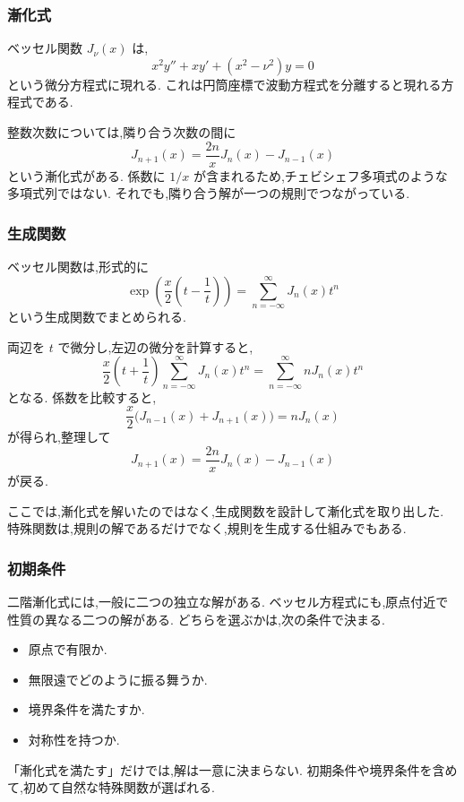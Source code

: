 \subsubsection{漸化式}

ベッセル関数 $J_\nu(x)$ は,
\[
  x^2y''+xy'+(x^2-\nu^2)y=0
\]
という微分方程式に現れる.
これは円筒座標で波動方程式を分離すると現れる方程式である.

整数次数については,隣り合う次数の間に
\[
  J_{n+1}(x)
  =\frac{2n}{x}J_n(x)-J_{n-1}(x)
\]
という漸化式がある.
係数に $1/x$ が含まれるため,チェビシェフ多項式のような多項式列ではない.
それでも,隣り合う解が一つの規則でつながっている.

\subsubsection{生成関数}

ベッセル関数は,形式的に
\[
  \exp\left(\frac{x}{2}\left(t-\frac1t\right)\right)
  =\sum_{n=-\infty}^{\infty}J_n(x)t^n
\]
という生成関数でまとめられる.

両辺を $t$ で微分し,左辺の微分を計算すると,
\[
  \frac{x}{2}\left(t+\frac1t\right)
  \sum_{n=-\infty}^{\infty}J_n(x)t^n
  =
  \sum_{n=-\infty}^{\infty}nJ_n(x)t^n
\]
となる.
係数を比較すると,
\[
  \frac{x}{2}\bigl(J_{n-1}(x)+J_{n+1}(x)\bigr)
  =nJ_n(x)
\]
が得られ,整理して
\[
  J_{n+1}(x)=\frac{2n}{x}J_n(x)-J_{n-1}(x)
\]
が戻る.

ここでは,漸化式を解いたのではなく,生成関数を設計して漸化式を取り出した.
特殊関数は,規則の解であるだけでなく,規則を生成する仕組みでもある.

\subsubsection{初期条件}

二階漸化式には,一般に二つの独立な解がある.
ベッセル方程式にも,原点付近で性質の異なる二つの解がある.
どちらを選ぶかは,次の条件で決まる.

\begin{itemize}
  \item 原点で有限か.
  \item 無限遠でどのように振る舞うか.
  \item 境界条件を満たすか.
  \item 対称性を持つか.
\end{itemize}

「漸化式を満たす」だけでは,解は一意に決まらない.
初期条件や境界条件を含めて,初めて自然な特殊関数が選ばれる.


